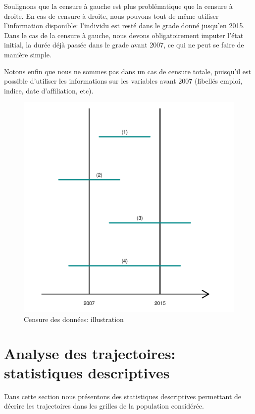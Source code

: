 \documentclass[11pt,a4paper]{article}
\begin{document}
Soulignons que la censure à gauche est plus problématique que la censure à droite. En cas de censure à droite, nous pouvons tout de même utiliser l'information disponible: l'individu est resté dans le grade donné jusqu'en 2015. Dans  le cas de la censure à gauche, nous devons obligatoirement imputer l'état initial, la durée déjà passée dans le grade avant 2007, ce qui ne peut se faire de manière simple. 

Notons enfin que nous ne sommes pas dans un cas de censure totale, puisqu'il est possible d'utiliser les informations sur les variables avant 2007 (libellés emploi, indice, date d'affiliation, etc). 


\begin{figure}[H] 
  \caption{Censure des données: illustration}
  \label{censure} 
    \includegraphics[scale = 0.5]{schema_censoring.pdf} 
\end{figure}



\section{Analyse des trajectoires: statistiques descriptives}

Dans cette section nous présentons des statistiques descriptives permettant de décrire les trajectoires dans les grilles de la population considérée. 
\end{document}
